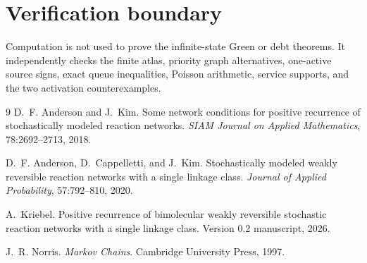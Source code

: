 \documentclass[11pt]{article}
\begin{document}
\section{Verification boundary}

Computation is not used to prove the infinite-state Green or debt theorems.
It independently checks the finite atlas, priority graph alternatives,
one-active source signs, exact queue inequalities, Poisson arithmetic,
service supports, and the two activation counterexamples.


\begin{thebibliography}{9}
D.~F. Anderson and J.~Kim.
\newblock Some network conditions for positive recurrence of stochastically modeled reaction networks.
\newblock \emph{SIAM Journal on Applied Mathematics}, 78:2692--2713, 2018.

D.~F. Anderson, D.~Cappelletti, and J.~Kim.
\newblock Stochastically modeled weakly reversible reaction networks with a single linkage class.
\newblock \emph{Journal of Applied Probability}, 57:792--810, 2020.

A.~Kriebel.
\newblock Positive recurrence of bimolecular weakly reversible stochastic reaction networks with a single linkage class.
\newblock Version 0.2 manuscript, 2026.

J.~R. Norris.
\newblock \emph{Markov Chains}.
\newblock Cambridge University Press, 1997.
\end{thebibliography}
\end{document}
